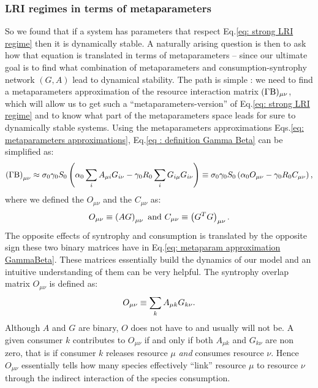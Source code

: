 \documentclass[12pt, titlepage]{report}
\begin{document}
\subsubsection{LRI regimes in terms of metaparameters}
So we found that if a system has parameters that respect Eq.\eqref{eq: strong LRI regime} then it is dynamically stable. A naturally arising question is then to ask %
how that equation is translated in terms of metaparameters -- since our ultimate goal is to find what combination of metaparameters and consumption-syntrophy network $(G,A)$ lead to dynamical stability.
The path is simple : we need to find a metaparameters approximation of the resource interaction matrix $(\Gamma\text{B})_{\mu \nu}$, which will allow us to get such a ``metaparameters-version'' of Eq.\eqref{eq: strong LRI regime} and to know what part of the metaparameters space leads for sure to dynamically stable systems.
Using the metaparameters approximations Eqs.\eqref{eq: metaparameters approximations}, Eq.\eqref{eq : definition Gamma Beta} can be simplified as:
\begin{equation}\label{eq: metaparam approximation GammaBeta}
\left(\Gamma \text{B}\right)_{\mu \nu}\approx \sigma_0 \gamma_0 S_0 \left(\alpha_0 \sum_i A_{\mu i}G_{i\nu}-\gamma_0 R_0 \sum_i G_{i\mu}G_{i\nu}\right)\equiv \sigma_0 \gamma_0 S_0 \left(\alpha_0 O_{\mu \nu}-\gamma_0R_0 C_{\mu\nu}\right),
\end{equation}
where we defined the  $O_{\mu\nu}$ and the  $C_{\mu\nu}$ as:
\begin{equation}
O_{\mu\nu} \equiv \left(AG\right)_{\mu \nu} \text{ and } C_{\mu\nu} \equiv \left(G^TG\right)_{\mu\nu}.
\end{equation}
The opposite effects of syntrophy and consumption is translated by the opposite sign these two binary matrices have in Eq.\eqref{eq: metaparam approximation GammaBeta}. These matrices essentially build the dynamics of our model and an intuitive understanding of them can be very helpful.
The syntrophy overlap matrix $O_{\mu\nu}$ is defined as:
\begin{equation}
O_{\mu\nu} \equiv \sum_k A_{\mu k} G_{k\nu}.
\end{equation}
Although $A$ and $G$ are binary, $O$ does not have to and usually will not be. A given consumer $k$ contributes to $O_{\mu\nu}$ if and only if both $A_{\mu k}$ and $G_{k\nu}$ are non zero, that is if consumer $k$ releases resource $\mu$ \textit{and} consumes resource $\nu$. Hence $O_{\mu\nu}$ essentially tells how many species effectively ``link'' resource $\mu$ to resource $\nu$ through the indirect interaction of the species consumption.
\end{document}
